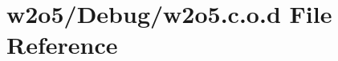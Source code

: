 \hypertarget{w2o5_8c_8o_8d}{}\section{w2o5/\+Debug/w2o5.c.\+o.\+d File Reference}
\label{w2o5_8c_8o_8d}
